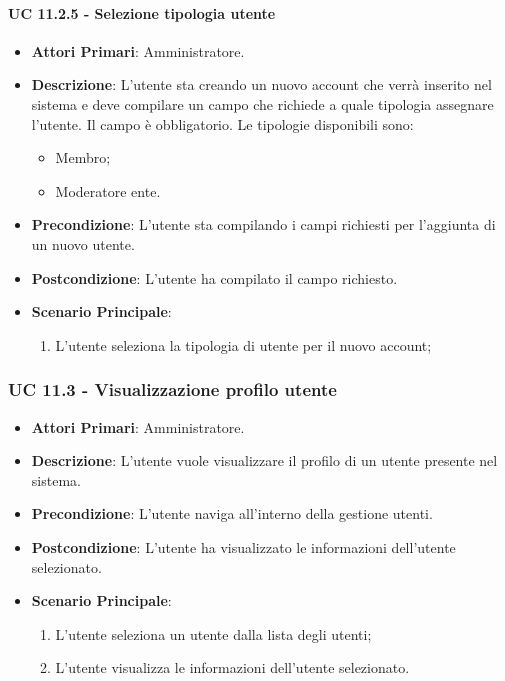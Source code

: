 			\paragraph{UC 11.2.5 - Selezione tipologia utente}
			\begin{itemize}
				\item \textbf{Attori Primari}: Amministratore.
				\item \textbf{Descrizione}: L'utente sta creando un nuovo account che verrà inserito nel sistema e deve compilare un campo che richiede a quale tipologia assegnare l'utente. Il campo è obbligatorio. Le tipologie disponibili sono:
				\begin{itemize}
					\item Membro;
					\item Moderatore ente.
				\end{itemize}
				\item \textbf{Precondizione}: L'utente sta compilando i campi richiesti per l'aggiunta di un nuovo utente.
				\item \textbf{Postcondizione}: L'utente ha compilato il campo richiesto.
				\item \textbf{Scenario Principale}:
				\begin{enumerate}
					\item{L'utente seleziona la tipologia di utente per il nuovo account;}
				\end{enumerate}	
			\end{itemize}

			\subsubsection{UC 11.3 - Visualizzazione profilo utente}
			\begin{itemize}
				\item \textbf{Attori Primari}: Amministratore.
				\item \textbf{Descrizione}: L'utente vuole visualizzare il profilo di un utente presente nel sistema.
				\item \textbf{Precondizione}: L'utente naviga all'interno della gestione utenti.
				\item \textbf{Postcondizione}: L'utente ha visualizzato le informazioni dell'utente selezionato.
				\item \textbf{Scenario Principale}:
				\begin{enumerate}
					\item{L'utente seleziona un utente dalla lista degli utenti;}
					\item{L'utente visualizza le informazioni dell'utente selezionato.}
				\end{enumerate}
			\end{itemize}


